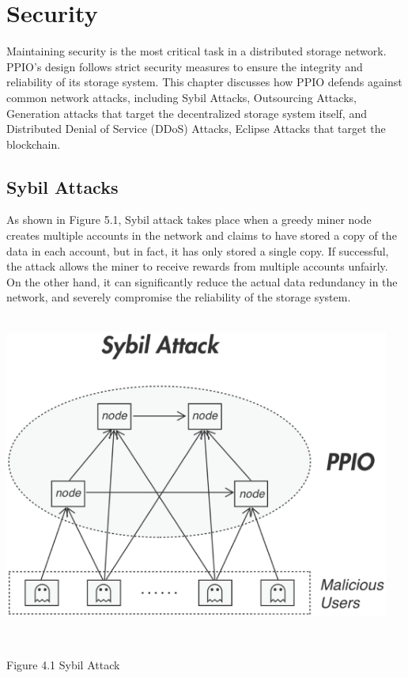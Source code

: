 \documentclass[10pt,a4paper]{article}
\begin{document}
   \section{Security} %
Maintaining security is the most critical task in a distributed storage network. PPIO’s design follows strict security measures to ensure the integrity and reliability of its storage system. This chapter discusses how PPIO defends against common network attacks, including Sybil Attacks, Outsourcing Attacks, Generation attacks that target the decentralized storage system itself, and Distributed Denial of Service (DDoS) Attacks, Eclipse Attacks that target the blockchain.
   \vspace{-0.5em}
      \subsection{Sybil Attacks} %
As shown in Figure 5.1, Sybil attack takes place when a greedy miner node creates multiple accounts in the network and claims to have stored a copy of the data in each account, but in fact, it has only stored a single copy. If successful, the attack allows the miner to receive rewards from multiple accounts unfairly. On the other hand, it can significantly reduce the actual data redundancy in the network, and severely compromise the reliability of the storage system.
\\\\ \centerline{\includegraphics[width=360pt]{fig15}}
\\ \centerline{{Figure 4.1 Sybil Attack}}
   \vspace{-1.5em}
\\
\end{document}
